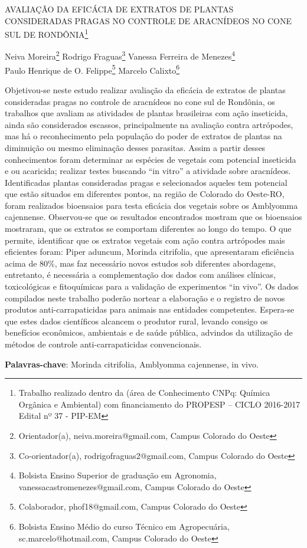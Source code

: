 \documentclass[article,12pt,onesidea,4paper,english,brazil]{abntex2}
\begin{document}
	
	
	\frenchspacing 
	
	\begin{center}
		\LARGE AVALIAÇÃO DA EFICÁCIA DE EXTRATOS DE PLANTAS CONSIDERADAS
		PRAGAS NO CONTROLE DE ARACNÍDEOS NO CONE SUL DE RONDÔNIA\footnote{Trabalho realizado dentro da (área de Conhecimento CNPq: Química Orgânica e Ambiental) com
			financiamento do PROPESP – CICLO 2016-2017 Edital nº 37 - PIP-EM}
		
		\normalsize
		Neiva Moreira\footnote{Orientador(a), neiva.moreira@gmail.com, Campus Colorado do Oeste} 
		Rodrigo Fraguas\footnote{Co-orientador(a), rodrigofraguas2@gmail.com, Campus Colorado do Oeste} 
		Vanessa Ferreira de Menezes\footnote{Bolsista Ensino Superior de graduação em Agronomia, vanessacastromenezes@gmail.com, Campus Colorado do Oeste} \\
		Paulo Henrique de O. Felippe\footnote{Colaborador, phof18@gmail.com, Campus Colorado do Oeste} 
		Marcelo	Calixto\footnote{Bolsista Ensino Médio do curso Técnico em Agropecuária, sc.marcelo@hotmail.com, Campus Colorado do Oeste} 
	\end{center}
	
	\noindent Objetivou-se neste estudo realizar avaliação da eficácia de extratos de
	plantas consideradas pragas no controle de aracnídeos no cone sul de Rondônia, os
	trabalhos que avaliam as atividades de plantas brasileiras com ação inseticida, ainda
	são considerados escassos, principalmente na avaliação contra artrópodes, mas há
	o reconhecimento pela população do poder de extratos de plantas na diminuição ou
	mesmo eliminação desses parasitas. Assim a partir desses conhecimentos foram
	determinar as espécies de vegetais com potencial inseticida e ou acaricida; realizar
	testes buscando “in vitro” a atividade sobre aracnídeos. Identificadas plantas
	consideradas pragas e selecionados aqueles tem potencial que estão situados em
	diferentes pontos, na região de Colorado do Oeste-RO, foram realizados bioensaios
	para testa eficácia dos vegetais sobre os Amblyomma cajennense. Observou-se que
	os resultados encontrados mostram que os bioensaios mostraram, que os extratos
	se comportam diferentes ao longo do tempo. O que permite, identificar que os
	extratos vegetais com ação contra artrópodes mais eficientes foram: Piper aduncum,
	Morinda citrifolia, que apresentaram eficiência acima de 80\%, mas faz necessário
	novos estudos sob diferentes abordagens, entretanto, é necessária a
	complementação dos dados com análises clínicas, toxicológicas e fitoquímicas para
	a validação de experimentos “in vivo”. Os dados compilados neste trabalho poderão
	nortear a elaboração e o registro de novos produtos anti-carrapaticidas para animais
	nas entidades competentes. Espera-se que estes dados científicos alcancem o
	produtor rural, levando consigo os benefícios econômicos, ambientais e de saúde
	pública, advindos da utilização de métodos de controle anti-carrapaticidas
	convencionais.
	
	\vspace{\onelineskip}
	
	\noindent
	\textbf{Palavras-chave}: Morinda citrifolia, Amblyomma cajennense, in vivo.
	
\end{document}
